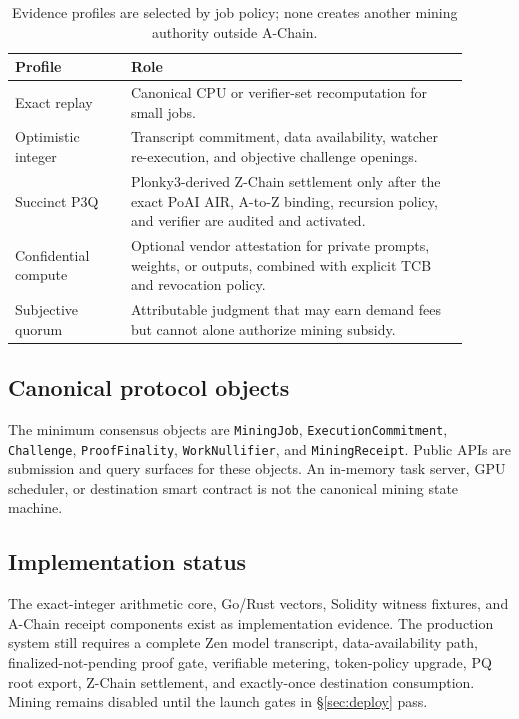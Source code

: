 \begin{table}[h]
\centering
\small
\begin{tabular}{p{0.23\linewidth}p{0.67\linewidth}}
\toprule
\textbf{Profile} & \textbf{Role} \\
\midrule
Exact replay & Canonical CPU or verifier-set recomputation for small jobs. \\
Optimistic integer & Transcript commitment, data availability, watcher
re-execution, and objective challenge openings. \\
Succinct P3Q & Plonky3-derived Z-Chain settlement only after the exact PoAI AIR,
A-to-Z binding, recursion policy, and verifier are audited and activated. \\
Confidential compute & Optional vendor attestation for private prompts, weights,
or outputs, combined with explicit TCB and revocation policy. \\
Subjective quorum & Attributable judgment that may earn demand fees but cannot
alone authorize mining subsidy. \\
\bottomrule
\end{tabular}
\caption{Evidence profiles are selected by job policy; none creates another
mining authority outside A-Chain.}
\end{table}

\subsection{Canonical protocol objects}

The minimum consensus objects are \texttt{Mining\allowbreak Job},
\texttt{Execution\allowbreak Commitment}, \texttt{Challenge},
\texttt{Proof\allowbreak Finality}, \texttt{Work\allowbreak Nullifier}, and
\texttt{Mining\allowbreak Receipt}. Public APIs are submission
and query surfaces for these objects. An in-memory task server, GPU scheduler,
or destination smart contract is not the canonical mining state machine.

\subsection{Implementation status}

The exact-integer arithmetic core, Go/Rust vectors, Solidity witness fixtures,
and A-Chain receipt components exist as implementation evidence. The production
system still requires a complete Zen model transcript, data-availability path,
finalized-not-pending proof gate, verifiable metering, token-policy upgrade, PQ
root export, Z-Chain settlement, and exactly-once destination consumption. Mining remains disabled
until the launch gates in \S\ref{sec:deploy} pass.
